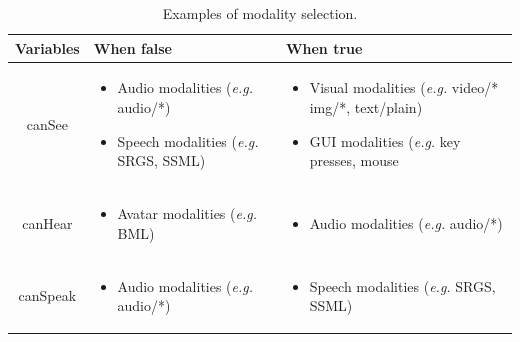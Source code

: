 \documentclass[
  doutorado,
  american
]{ThesisPUC}
\begin{document}
\begin{table}
\scriptsize
\def\arraystretch{1.5}
\begin{tabular}[!ht]{ c m{5.5cm} m{5.5cm}}

	\hline
	\textbf{Variables} & 
	\centering\arraybackslash \textbf{When false} & 
	\centering\arraybackslash \textbf{When true} \\
	\hline

	canSee &	
	\begin{itemize}
		\item Audio modalities \newline (\textit{e.g.} audio/*)
		\item Speech modalities \newline (\textit{e.g.} SRGS, SSML)
	\end{itemize}
	&	
	\begin{itemize}
		\item Visual modalities (\textit{e.g.} \newline video/* img/*, text/plain) 
		\item GUI modalities (\textit{e.g.} key presses, mouse
	\end{itemize} \\
	\hline
	
	canHear &
	\begin{itemize}
		\item Avatar modalities \newline (\textit{e.g.} BML)
	\end{itemize} 
	&		
	\begin{itemize}
		\item Audio modalities \newline (\textit{e.g.} audio/*)
	\end{itemize}\\
	\hline
	
	canSpeak &	
	\begin{itemize}
		\item Audio modalities \newline (\textit{e.g.} audio/*)
	\end{itemize}
	&	
	\begin{itemize}
		\item Speech modalities \newline (\textit{e.g.} SRGS, SSML)
	\end{itemize}\\
	\hline

\end{tabular}
\caption{Examples of modality selection.}
\label{table:selection}
\end{table}
\end{document}
